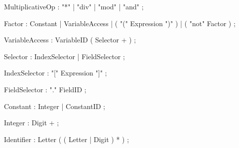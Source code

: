 \begin{rail}
MultiplicativeOp : "*" | "div" | "mod" | "and" ;
\end{rail}
\begin{rail}
Factor : Constant | VariableAccess | ( "(" Expression ")" ) | ( "not" Factor ) ;
\end{rail}
\begin{rail}
VariableAccess : VariableID ( Selector + ) ;
\end{rail}
\begin{rail}
Selector : IndexSelector | FieldSelector ;
\end{rail}
\begin{rail}
IndexSelector : "[" Expression "]" ;
\end{rail}
\begin{rail}
FieldSelector : "." FieldID ;
\end{rail}
\begin{rail}
Constant : Integer | ConstantID ;
\end{rail}
\begin{rail}
Integer : Digit + ;
\end{rail}
\begin{rail}
Identifier : Letter ( ( Letter | Digit ) * ) ;
\end{rail}



